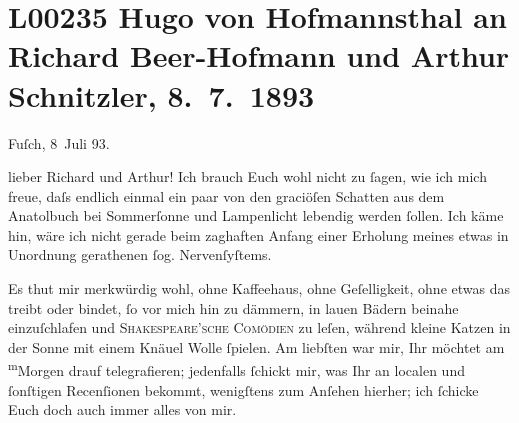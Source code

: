 

\section[Hugo von Hofmannsthal an Richard Beer-Hofmann und Arthur Schnitzler, 8. 7. 1893]{L00235 Hugo von Hofmannsthal an Richard Beer-Hofmann und Arthur Schnitzler,
               8. 7. 1893}
\nopagebreak{}
\rehead{ }\normalsize\beginnumbering{}
\toendnotes[C]{\smallbreak\pagebreak[2]}
\pstart
           \raggedleft{}{\pb}Fuſch, 8 Juli 93.\pend
           
\pstart{}lieber Richard und Arthur!\pend\vspace{0.5em}
\pstart
           Ich brauch Euch wohl nicht zu ſagen, wie ich mich freue, daſs endlich einmal ein paar
               von den graciöſen Schatten aus dem Anatolbuch
               bei Sommerſonne und Lampenlicht lebendig werden ſollen. Ich käme hin, wäre ich nicht
               gerade beim zaghaften Anfang einer Erholung meines etwas in Unordnung gerathenen ſog.
               Nervenſyſtems.\pend
           
\pstart
           Es thut mir merkwürdig wohl, ohne Kaffeehaus, ohne Geſelligkeit, ohne etwas das
               treibt oder bindet, ſo vor mich hin zu dämmern, {\pb}in
               lauen Bädern beinahe einzuſchlafen und \textsc{Shakespeare’sche Comödien} zu leſen,
               während kleine Katzen in der Sonne mit einem Knäuel Wolle ſpielen. Am liebſten war
               mir, Ihr möchtet am \substVorne{}\textsuperscript{m}\substDazwischen{}M\substHinten{}orgen drauf telegrafieren; jedenfalls ſchickt mir, was Ihr an  localen und ſonſtigen Recenſionen bekommt,
               wenigſtens zum Anſehen hierher; ich ſchicke Euch doch auch immer alles von mir.\pend
           
